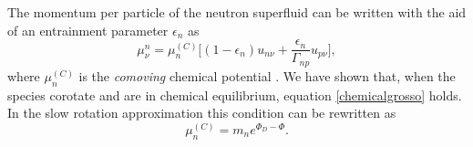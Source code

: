 \documentclass[usenatbib%
]{mnras}
\begin{document}
The momentum per particle of the neutron superfluid can be written with the aid of an entrainment parameter $\epsilon_n$ \citep{prix2005} as
\begin{equation}\label{momentaaaaaaaAAAAAaaaaa}
\mu_{\nu}^n = \mu_n^{(C)} \bigg[(1-\epsilon_n)u_{n\nu} + \dfrac{\epsilon_n}{\Gamma_{np}} u_{p\nu} \bigg], 
\end{equation}
where $\mu_n^{(C)}$ is the \emph{comoving} chemical potential \citep{Termo}. 
We have shown that, when the species corotate and are in chemical equilibrium, equation \eqref{chemicalgrosso} holds. In the slow rotation approximation this condition can be rewritten as
\begin{equation}\label{jJjJjJj}
\mu_n^{(C)} = m_n e^{\Phi_D - \Phi}.
\end{equation}
\end{document}
